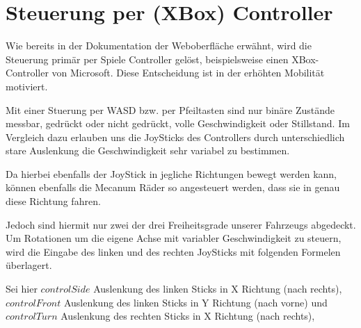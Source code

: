 \begin{table}[ht]
	\centering
\caption{Binäres Protokoll} 
\label{table:protokoll}
\end{table} 



\section{Steuerung per (XBox) Controller}
Wie bereits in der Dokumentation der Weboberfläche erwähnt, wird die Steuerung primär per Spiele Controller gelöst, beispielsweise einen XBox-Controller von Microsoft.
Diese Entscheidung ist in der erhöhten Mobilität motiviert. 

Mit einer Stuerung per WASD bzw. per Pfeiltasten sind nur binäre Zustände messbar, gedrückt oder nicht gedrückt, volle Geschwindigkeit oder Stillstand.
Im Vergleich dazu erlauben uns die JoySticks des Controllers durch unterschiedlich stare Auslenkung die Geschwindigkeit sehr variabel zu bestimmen.

Da hierbei ebenfalls der JoyStick in jegliche Richtungen bewegt werden kann, können ebenfalls die Mecanum Räder so angesteuert werden, dass sie in genau diese Richtung fahren.

Jedoch sind hiermit nur zwei der drei Freiheitsgrade unserer Fahrzeugs abgedeckt. Um Rotationen um die eigene Achse mit variabler Geschwindigkeit zu steuern, wird die Eingabe des linken und des rechten JoySticks mit folgenden Formelen überlagert.

\bigskip
Sei hier $controlSide$ Auslenkung des linken Sticks in X Richtung (nach rechts), 
$controlFront$ Auslenkung des linken Sticks in Y Richtung (nach vorne) und 
$controlTurn$ Auslenkung des rechten Sticks in X Richtung (nach rechts), 

